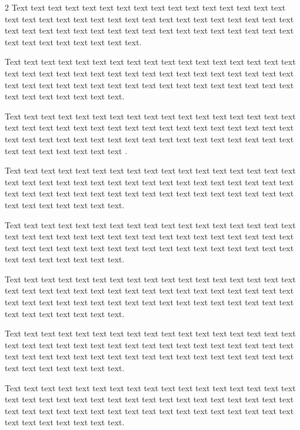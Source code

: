 \documentclass[12pt,twoside]{apa7}
\begin{document}
\begin{multicols}{2}
Text text text text text text text text text text text text text text text text text text text text text text text text text text text text text text text text text text text text text text text text text text text text text text text text text text text text text text text text text text.

Text text text text text text text text text text text text text text text text text text text text text text text text text text text text text text text text text text text text text text text text text text text text text text text text text text text text text text text text text text.

Text text text text text text text text text text text text text text text text text text text text text text text text text text text text text text text text text text text text text text text text text text text text text text text text text text text text text text text text text text \parencite{Cueva2022}.

Text text text text text text text text text text text text text text text text text text text text text text text text text text text text text text text text text text text text text text text text text text text text text text text text text text text text text text text text text text.

Text text text text text text text text text text text text text text text text text text text text text text text text text text text text text text text text text text text text text text text text text text text text text text text text text text text text text text text text text text.

Text text text text text text text text text text text text text text text text text text text text text text text text text text text text text text text text text text text text text text text text text text text text text text text text text text text text text text text text text text.

Text text text text text text text text text text text text text text text text text text text text text text text text text text text text text text text text text text text text text text text text text text text text text text text text text text text text text text text text text text.

Text text text text text text text text text text text text text text text text text text text text text text text text text text text text text text text text text text text text text text text text text text text text text text text text text text text text text text text text text text.



\end{multicols}
\end{document}
